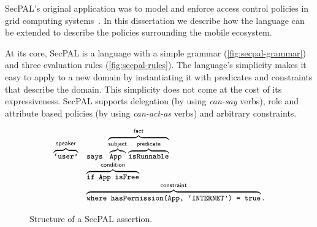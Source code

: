 \documentclass[thesis.tex]{subfiles}
\begin{document}
SecPAL's original application was to model and enforce access control
policies in grid computing systems~\cite{becker_secpal:_2010}.  In
this dissertation we describe how the language can be extended to
describe the policies surrounding the mobile ecosystem.

At its core, SecPAL is a language with a simple grammar
(\autoref{fig:secpal-grammar}) and three evaluation rules
(\autoref{fig:secpal-rules}). The language's simplicity makes it easy
to apply to a new domain by instantiating it with predicates and
constraints that describe the domain. This simplicity does not come at
the cost of its expressiveness. SecPAL supports delegation (by using
\emph{can-say} verbs), role and attribute based policies (by using
\emph{can-act-as} verbs) and arbitrary constraints.

\begin{figure}
  \newcommand{\bracetext}[1]{\text{\sffamily #1}}
  \newcommand{\smalltext}[1]{\text{\ttfamily\small #1}}
  \centering
  \begin{equation*}
    \begin{array}{r l}
      \overbrace{\smalltext{`user'}}^{\bracetext{speaker}} &
                                                             \smalltext{ says }\overbrace{\overbrace{\smalltext{ App }}^{\bracetext{subject}}\overbrace{\smalltext{ isRunnable}}^{\bracetext{predicate}}}^{\bracetext{fact}} \\
                                                           & \overbrace{\smalltext{ if App isFree}}^{\bracetext{condition}} \\
                                                           & \overbrace{\smalltext{ where hasPermission(App, `INTERNET') = true}}^{\bracetext{constraint}}.
    \end{array}
  \end{equation*}
  \caption{Structure of a SecPAL assertion.}
  \label{fig:assertion}
\end{figure}
\end{document}
